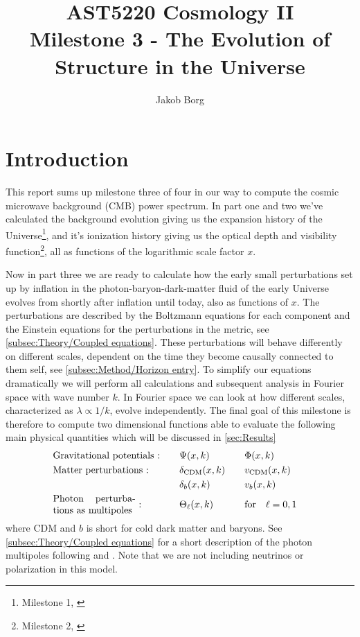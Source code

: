 \documentclass[10pt,a4paper]{article}
\title{AST5220 Cosmology \rm{II}\\ 
\vspace{5mm}Milestone 3 - The Evolution of Structure in the Universe}
\author{Jakob Borg}
\providecommand{\rCDM}
{\ensuremath{
\textrm{CDM}
}
}
\begin{document}
\maketitle
{}

\section{Introduction}
\label{sec:Introduction}
This report sums up milestone three of four in our way to compute the cosmic microwave background (CMB) power spectrum. In part one and two we've calculated the background evolution giving us the expansion history of the Universe\footnote{Milestone 1, \cite{milestone1}}, and it's ionization history giving us the optical depth and visibility function\footnote{Milestone 2, \cite{milestone2}}, all as functions of the logarithmic scale factor $x$.

Now in part three we are ready to calculate how the early small perturbations set up by inflation in the photon-baryon-dark-matter fluid of the early Universe evolves from shortly after inflation until today, also as functions of $x$. The perturbations are described by the Boltzmann equations for each component and the Einstein equations for the perturbations in the metric, see \cref{subsec:Theory/Coupled equations}. These perturbations will behave differently on different scales, dependent on the time they become causally connected to them self, see \cref{subsec:Method/Horizon entry}. To simplify our equations dramatically we will perform all calculations and subsequent analysis in Fourier space with wave number $k$. In Fourier space we can look at how different scales, characterized as $\lambda \propto 1/k$, evolve independently. The final goal of this milestone is therefore to compute two dimensional functions able to evaluate the following main physical quantities which will be discussed in \cref{sec:Results}
\begin{alignat*}{4}
  & \text{Gravitational potentials :} &\quad& \Psi(x,k) &\quad& \Phi(x,k) &
  \\
  & \text{Matter perturbations :}     &\quad& \delta_{\rCDM}(x,k) &\quad& v_{\rCDM}(x,k) &
  \\
  &                                  &\quad& \delta_{b}(x,k) &\quad& v_{b}(x,k) &
  \\
  & \text{\parbox{3cm}{Photon perturbations as multipoles} :}
                                  &\quad& \Theta_\ell(x,k) &\quad& \qfor* \ell = {0,1}&
\end{alignat*}%
where \rm{CDM} and $b$ is short for cold dark matter and baryons. See \cref{subsec:Theory/Coupled equations} for a short description of the photon multipoles following \cite{Calin} and \cite{Dodelson}.  Note that we are not including neutrinos or polarization in this model.
\end{document}
